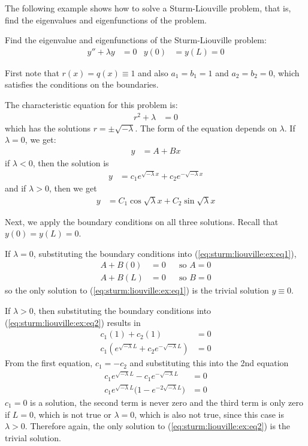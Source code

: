 The following example shows how to solve a Sturm-Liouville problem, that is, find the eigenvalues and eigenfunctions of the problem.  

\begin{example} \label{ex:sturm:liouville}
Find the eigenvalue and eigenfunctions of the Sturm-Liouville problem:
\begin{align*}
y''+\lambda y & = 0 & y(0) & = y(L)  = 0 
\end{align*}

\solution

First note that $r(x)=q(x) \equiv 1$ and also $a_1=b_1=1$ and $a_2=b_2=0$, which satisfies the conditions on the boundaries.  

The characteristic equation for this problem is:
%
\begin{align*}
r^2+\lambda & = 0 
\end{align*}
which has the solutions $r = \pm \sqrt{-\lambda}$.  The form of the equation depends on $\lambda$.  If $\lambda=0$, we get:
%
\begin{align} \label{eq:sturm:liouville:ex:eq1}
y & = A + B x
\end{align}
if $\lambda<0$, then the solution is
%
\begin{align} \label{eq:sturm:liouville:ex:eq2}
y & = c_1 e^{\sqrt{-\lambda} x} + c_2 e^{-\sqrt{-\lambda} x} 
\end{align}
and if $\lambda>0$, then we get
% 
\begin{align} \label{eq:sturm:liouville:ex:eq3}
y & = C_1 \cos \sqrt{\lambda} x + C_2 \sin \sqrt{\lambda} x 
\end{align}

Next, we apply the boundary conditions on all three solutions.  Recall that $y(0)=y(L)=0$. 

If $\lambda = 0$, substituting the boundary conditions into (\ref{eq:sturm:liouville:ex:eq1}),
%
\begin{align*}
A+ B(0)& = 0 && \text{so $A=0$} \\
A+B(L) & = 0 && \text{so $B=0$}
\end{align*}
so the only solution to (\ref{eq:sturm:liouville:ex:eq1}) is the trivial solution $y\equiv 0$.  

If $\lambda >0$, then substituting the boundary conditions into (\ref{eq:sturm:liouville:ex:eq2}) results in 
\begin{align*}
c_1 (1) + c_2(1) & = 0 \\
c_1(e^{\sqrt{-\lambda} L} + c_2 e^{-\sqrt{-\lambda} L}) & = 0 
\end{align*}
From the first equation, $c_1=-c_2$ and substituting this into the 2nd equation
%
\begin{align*}
c_1 e^{\sqrt{-\lambda} L} - c_1 e^{-\sqrt{-\lambda} L} & = 0 \\
c_1 e^{\sqrt{-\lambda}L} \bigl( 1- e^{-2\sqrt{-\lambda} L}) & = 0
\end{align*}
$c_1=0$ is a solution, the second term is never zero and the third term is only zero if $L=0$, which is not true or $\lambda=0$, which is also not true, since this case is $\lambda >0$.  Therefore again, the only solution to (\ref{eq:sturm:liouville:ex:eq2}) is the trivial solution. 


\end{example}
